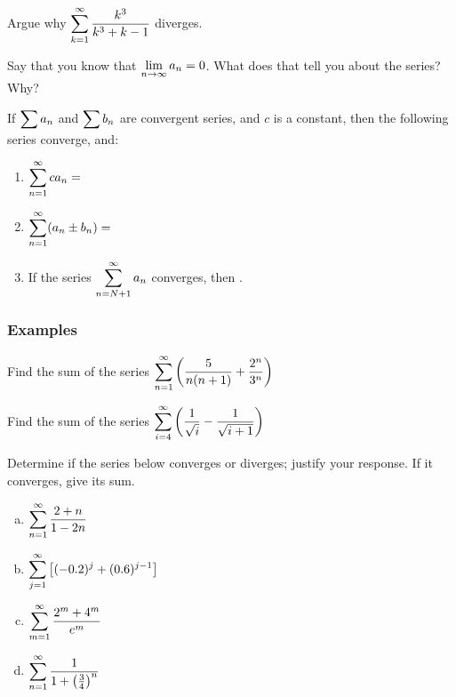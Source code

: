 \documentclass[notes]{subfiles}
\begin{document}
		\begin{ex}
			Argue why $\displaystyle \sum_{k = 1}^\infty \dfrac{k^3}{k^3 +k - 1}$ diverges.
		\end{ex}
			
		\begin{question}
			Say that you know that $\displaystyle \lim_{n\to\infty} a_n = 0$.  What does that tell you about the series?  Why?
		\end{question}
			\newpage
			
		\begin{rmk}
			If $\displaystyle \sum a_n$ and $\displaystyle \sum b_n$ are convergent series, and $c$ is a constant, then the following series converge, and:\\
			\begin{enumerate}[(1)]
				\setlength \itemsep{20pt}
				
				\item $\displaystyle \sum_{n = 1}^\infty ca_n = $
				\item $\displaystyle \sum_{n =1 }^\infty (a_n \pm b_n) = $
				\item If the series $\displaystyle \sum_{n = N + 1}^\infty a_n$ converges, then .
				
			\end{enumerate}	
		\end{rmk}
		
	\subsubsection*{Examples}
		\begin{ex}
			Find the sum of the series $\displaystyle \sum_{n = 1}^\infty \left( \dfrac{5}{n(n+1)} + \dfrac{2^n}{3^n}\right)$
		\end{ex}		
			
		\begin{ex}
			Find the sum of the series $\displaystyle \sum_{i = 4}^\infty \left( \dfrac{1}{\sqrt{i}} - \dfrac{1}{\sqrt{i+1}}\right)$
		\end{ex}
			\newpage
			
		\begin{ex}
			Determine if the series below converges or diverges; justify your response.  If it converges, give its sum.
			\begin{enumerate}[(a)]
				\item $\displaystyle \sum_{n =1}^\infty \dfrac{2 + n}{1-2n}$
					
				\item $\displaystyle \sum_{j = 1}^\infty \left[(-0.2)^j + (0.6)^{j-1}\right]$
					
				\item $\displaystyle \sum_{m = 1}^\infty \dfrac{2^m + 4^m}{e^m}$
					
				\item $\displaystyle \sum_{n = 1}^\infty \dfrac{1}{1 + \left( \frac{3}{4}\right)^n}$
			\end{enumerate}		
		\end{ex}
			\newpage
			
\end{document}
